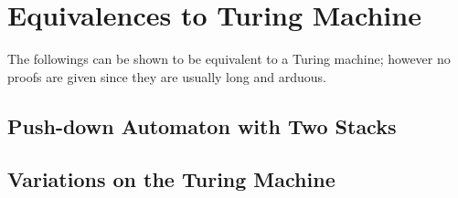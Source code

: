 \documentclass{report}
\begin{document}
		
		\section{Equivalences to Turing Machine}
			The followings can be shown to be equivalent to a Turing machine; however no proofs are given since they are usually long and arduous.
			\subsection{Push-down Automaton with Two Stacks}
			
			\subsection{Variations on the Turing Machine} \label{var_TM}
			
\end{document}
